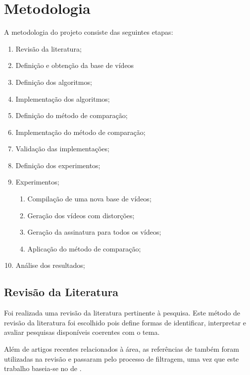 
\chapter{Metodologia}
\label{chap:metodologia}

A metodologia do projeto consiste das seguintes etapas:

\begin{enumerate}
\item Revisão da literatura;
\item Definição e obtenção da base de vídeos
\item Definição dos algoritmos;
\item Implementação dos algoritmos; 
\item Definição do método de comparação;
\item Implementação do método de comparação;
\item Validação das implementações;
\item Definição dos experimentos;
\item Experimentos;
	\begin{enumerate}
		\item Compilação de uma nova base de vídeos;
        \item Geração dos vídeos com distorções;
        \item Geração da assinatura para todos os vídeos;
        \item Aplicação do método de comparação;
	\end{enumerate}
\item Análise dos resultados;
\end{enumerate}

\section{Revisão da Literatura}

Foi realizada uma revisão da literatura pertinente à pesquisa. Este método de revisão da literatura foi escolhido pois define formas de identificar, interpretar e avaliar pesquisas disponíveis coerentes com o tema. 

Além de artigos recentes relacionados à área, as referências de \cite{sylvio2015} também foram utilizadas na revisão e passaram pelo processo de filtragem, uma vez que este trabalho baseia-se no de \cite{sylvio2015}.

